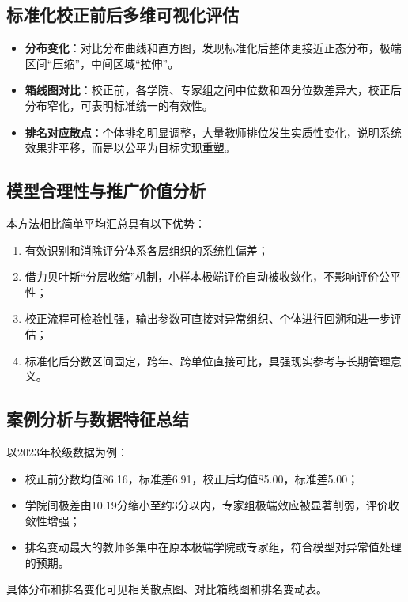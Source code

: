 \subsection{标准化校正前后多维可视化评估}
\begin{itemize}
    \item \textbf{分布变化}：对比分布曲线和直方图，发现标准化后整体更接近正态分布，极端区间“压缩”，中间区域“拉伸”。
    \item \textbf{箱线图对比}：校正前，各学院、专家组之间中位数和四分位数差异大，校正后分布窄化，可表明标准统一的有效性。
    \item \textbf{排名对应散点}：个体排名明显调整，大量教师排位发生实质性变化，说明系统效果非平移，而是以公平为目标实现重塑。
\end{itemize}

\subsection{模型合理性与推广价值分析}
本方法相比简单平均汇总具有以下优势：

\begin{enumerate}
    \item 有效识别和消除评分体系各层组织的系统性偏差；
    \item 借力贝叶斯“分层收缩”机制，小样本极端评价自动被收敛化，不影响评价公平性；
    \item 校正流程可检验性强，输出参数可直接对异常组织、个体进行回溯和进一步评估；
    \item 标准化后分数区间固定，跨年、跨单位直接可比，具强现实参考与长期管理意义。
\end{enumerate}

\subsection{案例分析与数据特征总结}
以2023年校级数据为例：

\begin{itemize}
    \item 校正前分数均值86.16，标准差6.91，校正后均值85.00，标准差5.00；
    \item 学院间极差由10.19分缩小至约3分以内，专家组极端效应被显著削弱，评价收敛性增强；
    \item 排名变动最大的教师多集中在原本极端学院或专家组，符合模型对异常值处理的预期。
\end{itemize}
具体分布和排名变化可见相关散点图、对比箱线图和排名变动表。

